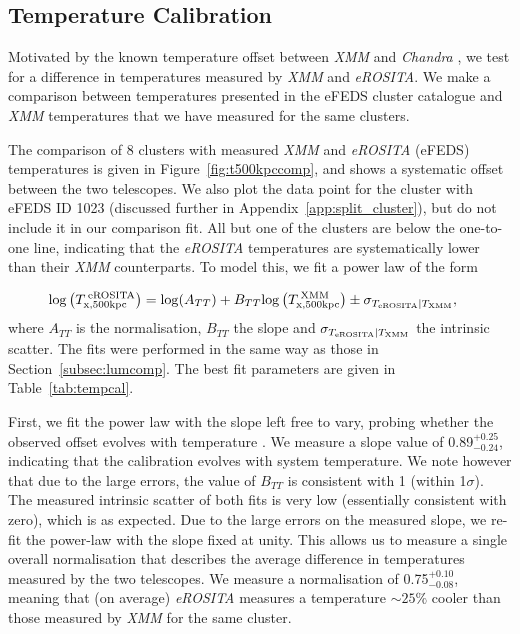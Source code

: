 \documentclass[fleqn,usenatbib]{mnras}
\begin{document}
\subsection{Temperature Calibration}
\label{subsec:tcal}
Motivated by the known temperature offset between {\em XMM} and {\em Chandra} \citep[][]{xmmchandracal}, we test for a difference in temperatures measured by {\em XMM} and {\em eROSITA}. We make a comparison between temperatures presented in the eFEDS cluster catalogue and {\em XMM} temperatures that we have measured for the same clusters. 

The comparison of 8 clusters with measured {\em XMM} and {\em eROSITA} (eFEDS) temperatures is given in Figure~\ref{fig:t500kpccomp}, and shows a systematic offset between the two telescopes. We also plot the data point for the cluster with eFEDS ID 1023 (discussed further in Appendix~\ref{app:split_cluster}), but do not include it in our comparison fit. All but one of the clusters are below the one-to-one line, indicating that the {\em eROSITA} temperatures are systematically lower than their {\em XMM} counterparts. To model this, we fit a power law of the form

\begin{align}
{\rm log}\left(T^{\:\rm{eROSITA}}_{\rm{x, 500kpc}}\right) &= {\rm log}(A_{TT}) + B_{TT}{\rm log}\left(T^{\:\rm{XMM}}_{\rm{x, 500kpc}}\right) \pm \sigma_{T_{\rm{eROSITA}}|T_{\rm{XMM}}},
\label{equ:TvsT}
\end{align}
where $A_{TT}$ is the normalisation, $B_{TT}$ the slope and $\sigma_{T_{\rm{eROSITA}}|T_{\rm{XMM}}}$ the intrinsic scatter. The fits were performed in the same way as those in Section~\ref{subsec:lumcomp}. The best fit parameters are given in Table~\ref{tab:tempcal}. 

First, we fit the power law with the slope left free to vary, probing whether the observed offset evolves with temperature \citep[as found in][comparing between {\em Chandra} and {\em XMM}]{xmmchandracal}. We measure a slope value of 0.89$^{+0.25}_{-0.24}$, indicating that the calibration evolves with system temperature.  We note however that due to the large errors, the value of $B_{TT}$ is consistent with 1 (within 1$\sigma$).  The measured intrinsic scatter of both fits is very low (essentially consistent with zero), which is as expected. Due to the large errors on the measured slope, we re-fit the power-law with the slope fixed at unity. This allows us to measure a single overall normalisation that describes the average difference in temperatures measured by the two telescopes.  We measure a normalisation of 0.75$^{+0.10}_{-0.08}$, meaning that (on average) {\em eROSITA} measures a temperature ${\sim}25\%$ cooler than those measured by {\em XMM} for the same cluster. 
\end{document}
